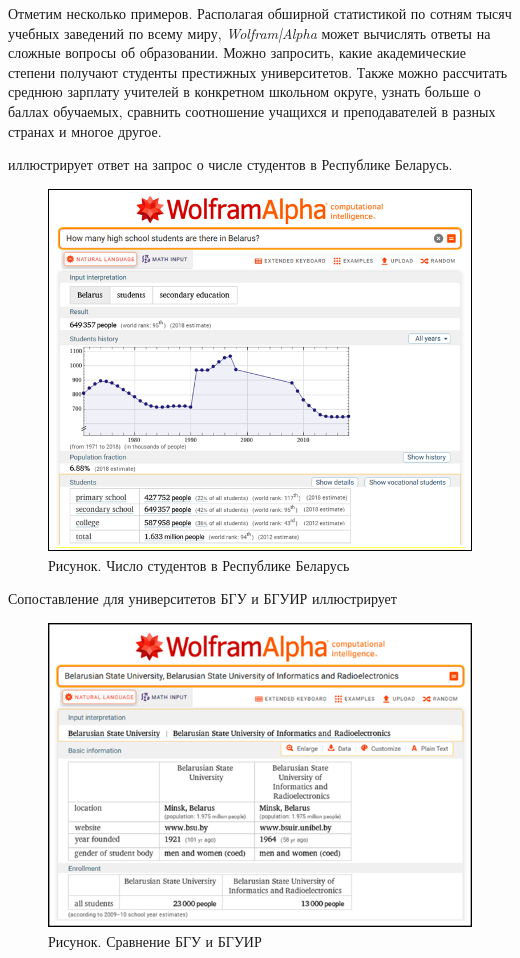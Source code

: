 Отметим несколько примеров. Располагая обширной статистикой по сотням тысяч учебных заведений по всему миру, \textit{Wolfram|Alpha} может вычислять ответы на сложные вопросы об образовании.
Можно запросить, какие академические степени получают студенты престижных университетов. 
Также можно рассчитать среднюю зарплату учителей в конкретном школьном округе, узнать больше о баллах обучаемых, сравнить соотношение учащихся и преподавателей в разных странах и многое другое.

\textit{} иллюстрирует ответ на запрос о числе студентов в Республике Беларусь. 
\begin{figure}[H]
	\includegraphics[scale=0.7]{images/part7/chapter_integration/integr_alg2.png}
	\caption{Рисунок. Число студентов в Республике Беларусь}
	\label{fig:integr_alg2}
\end{figure}

Сопоставление для университетов БГУ и БГУИР иллюстрирует  \textit{}
\begin{figure}[H]
	\includegraphics[scale=0.86]{images/part7/chapter_integration/integr_alg3.png}
	\caption{Рисунок. Сравнение БГУ и БГУИР}
	\label{fig:integr_alg3}
\end{figure}

